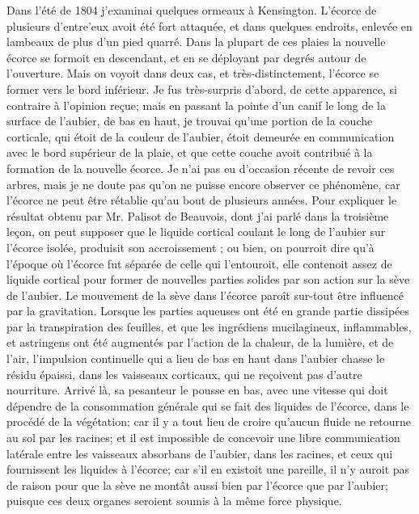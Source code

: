 Dans l'été de 1804 j'examinai quelques ormeaux à Kensington. L'écorce de plusieurs d'entre'eux avoit été fort attaquée, et dans quelques endroits, enlevée en lambeaux de plus d'un pied quarré. Dans la plupart de ces plaies la nouvelle écorce se formoit en descendant, et en se déployant par degrés autour de l'ouverture. Mais on voyoit dans deux cas, et très-distinctement, l'écorce se former vers le bord inférieur. Je fus très-surpris d'abord, de cette apparence, si contraire à l'opinion reçue; mais en passant la pointe d'un canif le long de la surface de l'aubier, de bas en haut, je trouvai qu'une portion de la couche corticale, qui étoit de la couleur de l'aubier, étoit demeurée en communication avec le bord supérieur de la plaie, et que cette couche avoit contribué\setcounter{page}{96} à la formation de la nouvelle écorce. Je n'ai pas eu d'occasion récente de revoir ces arbres, mais je ne doute pas qu'on ne puisse encore observer ce phénomène, car l'écorce ne peut être rétablie qu'au bout de plusieurs années. Pour expliquer le résultat obtenu par Mr. Palisot de Beauvois, dont j'ai parlé dans la troisième leçon, on peut supposer que le liquide cortical coulant le long de l'aubier sur l'écorce isolée, produisit son accroissement ; ou bien, on pourroit dire qu'à l'époque où l'écorce fut séparée de celle qui l'entouroit, elle contenoit assez de liquide cortical pour former de nouvelles parties solides par son action sur la sève de l'aubier. Le mouvement de la sève dans l'écorce paroît sur-tout être influencé par la gravitation. Lorsque les parties aqueuses ont été en grande partie dissipées par la transpiration des feuilles, et que les ingrédiens mucilagineux, inflammables, et astringens ont été augmentés par l'action de la chaleur, de la lumière, et de l'air, l'impulsion continuelle qui a lieu de bas en haut dans l'aubier chasse le résidu épaissi, dans les vaisseaux corticaux, qui ne reçoivent pas d'autre nourriture. Arrivé là, sa pesanteur le pousse en bas, avec une vitesse qui doit dépendre\setcounter{page}{97} de la consommation générale qui se fait des liquides de l'écorce, dans le procédé de la végétation; car il y a tout lieu de croire qu'aucun fluide ne retourne au sol par les racines; et il est impossible de concevoir une libre communication latérale entre les vaisseaux absorbans de l'aubier, dans les racines, et ceux qui fournissent les liquides à l'écorce; car s'il en existoit une pareille, il n'y auroit pas de raison pour que la sève ne montât aussi bien par l'écorce que par l'aubier; puisque ces deux organes seroient soumis à la même force physique.
